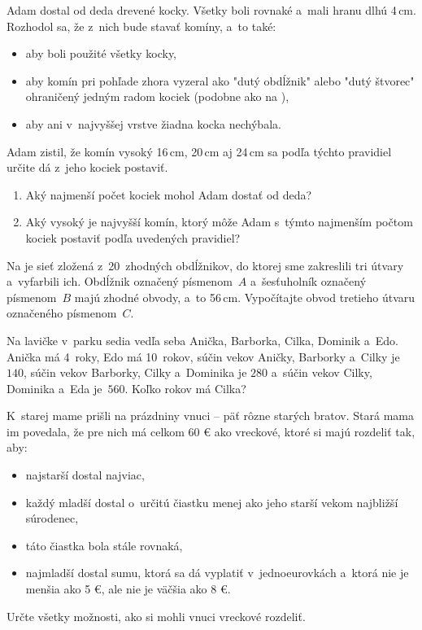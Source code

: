 {%
Adam dostal od deda drevené kocky.
Všetky boli rovnaké a~mali hranu dlhú 4\,cm.
Rozhodol sa, že z~nich bude stavať komíny, a~to také:
\begin{itemize}
  \item aby boli použité všetky kocky,
  \item aby komín pri pohľade zhora vyzeral ako "dutý obdĺžnik" alebo "dutý
        štvorec" ohraničený jedným radom kociek (podobne ako na \obr),
  \item aby ani v~najvyššej vrstve žiadna kocka nechýbala.%
\end{itemize}
\noindent
Adam zistil, že komín vysoký 16\,cm, 20\,cm aj 24\,cm sa podľa týchto pravidiel určite dá z~jeho kociek postaviť.
\begin{enumerate}
  \item Aký najmenší počet kociek mohol Adam dostať od deda?
  \item Aký vysoký je najvyšší komín, ktorý môže Adam s~týmto najmenším počtom kociek
        postaviť podľa uvedených pravidiel?
\end{enumerate}
}

{%
Na \obr{} je sieť zložená z~20~zhodných obdĺžnikov, do ktorej sme zakreslili
tri útvary a~vyfarbili ich.
Obdĺžnik označený písmenom~$A$ a~šesťuholník označený písmenom~$B$ majú
zhodné obvody, a~to 56\,cm.
Vypočítajte obvod tretieho útvaru označeného písmenom~$C$.%
}

{%
Na lavičke v~parku sedia vedľa seba Anička, Barborka, Cilka, Dominik a~Edo.
Anička má 4~roky, Edo má 10~rokov, súčin vekov Aničky, Barborky a~Cilky
je $140$, súčin vekov Barborky, Cilky a~Dominika je $280$ a~súčin vekov Cilky,
Dominika a~Eda je~$560$.
Koľko rokov má Cilka?}

{%
K~starej mame prišli na prázdniny vnuci --
päť rôzne starých bratov.
Stará mama im povedala, že pre nich má celkom 60 € ako vreckové,
ktoré si majú rozdeliť tak, aby:
\begin{itemize}
  \item najstarší dostal najviac,
  \item každý mladší dostal o~určitú čiastku menej ako jeho
    starší vekom najbližší súrodenec,
  \item táto čiastka bola stále rovnaká,
  \item najmladší dostal sumu, ktorá sa dá vyplatiť v~jednoeurovkách
        a~ktorá nie je menšia ako 5 €, ale nie je väčšia ako 8 €.
\end{itemize}
\noindent
Určte všetky možnosti, ako si mohli vnuci vreckové rozdeliť.
}

